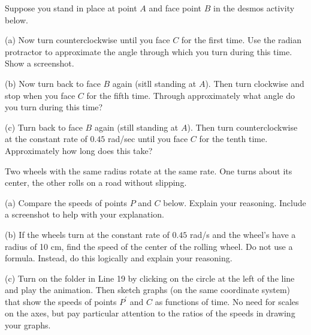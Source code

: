 \documentclass{ximera}
\begin{document}
\begin{exploration}\label{exp:angles1}
Suppose you stand in place at point $A$ and face point $B$ in the desmos activity below. 

(a) Now turn counterclockwise until you face $C$ for the first time. Use the radian protractor to approximate the angle through which you turn during this time. Show a screenshot.

(b) Now turn back to face $B$ again (sitll standing at $A$). Then turn clockwise and stop when you face $C$ for the fifth time. Through approximately what angle do you turn during this time? 

(c) Turn back to face $B$ again (still standing at $A$). Then turn counterclockwise at the constant rate of $0.45$ rad/sec until you face $C$ for the tenth time. Approximately how long does this take? 


 
\begin{onlineOnly}
    \begin{center}
\end{center}
\end{onlineOnly}
\end{exploration}







\begin{exploration}\label{exp:angles2}
Two wheels with the same radius rotate at the same rate. One turns about its center, the other rolls on a road without slipping.

(a) Compare the speeds of points $P$ and $C$ below. Explain your reasoning. Include a screenshot to help with your explanation.

(b) If the wheels turn at the constant rate of $0.45$ rad/s and the wheel's have a radius of 10 cm, find the speed of the center of the rolling wheel. Do not use a  formula. Instead, do this logically and explain your reasoning. 

(c) Turn on the folder in Line 19 by clicking on the circle at the left of the line and play the animation. Then sketch graphs (on the same coordinate system) that show the speeds of points $P^\prime$ and $C$ as functions of time. No need for scales on the axes, but pay particular attention to the ratios of the speeds in drawing  your graphs.


 
\begin{onlineOnly}
    \begin{center}
\end{center}
\end{onlineOnly}
\end{exploration}
\end{document}
